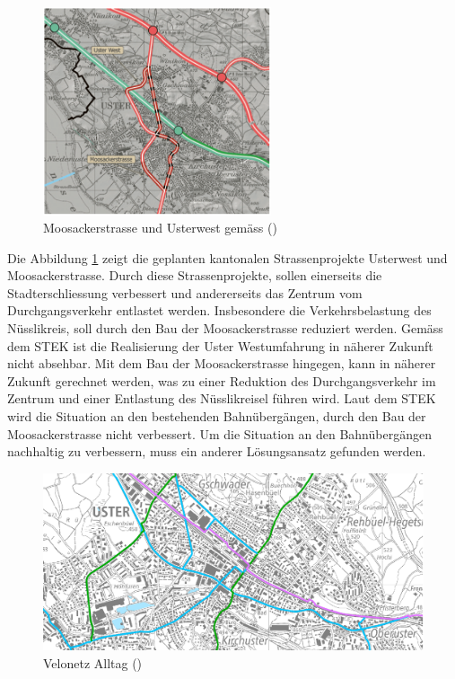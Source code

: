 \begin{figure}[h!]
	\centering
	\includegraphics[width=0.6\textwidth]{figures/04-04-UsterWest-Moosackerstr}
	\caption[Strassenprojekte im Kantonalen Richtplan]{Moosackerstrasse und Usterwest gemäss (\cite{STEK})}
	\label{img:Strassenprojekte}
\end{figure}

Die Abbildung \ref{img:Strassenprojekte} zeigt die geplanten kantonalen Strassenprojekte Usterwest und Moosackerstrasse. Durch diese Strassenprojekte, sollen einerseits die Stadterschliessung verbessert und andererseits das Zentrum vom Durchgangsverkehr entlastet werden. Insbesondere die Verkehrsbelastung des Nüsslikreis, soll durch den Bau der Moosackerstrasse reduziert werden. Gemäss dem STEK ist die Realisierung der Uster Westumfahrung in näherer Zukunft nicht absehbar. Mit dem Bau der Moosackerstrasse hingegen, kann in näherer Zukunft gerechnet werden, was zu einer Reduktion des Durchgangsverkehr im Zentrum und einer Entlastung des Nüsslikreisel führen wird. Laut dem STEK wird die Situation an den bestehenden Bahnübergängen, durch den Bau der Moosackerstrasse nicht verbessert. Um die Situation an den Bahnübergängen nachhaltig zu verbessern, muss ein anderer Lösungsansatz gefunden werden. 

\begin{figure}[h!]
	\centering
	\includegraphics[width=\textwidth]{figures/04-01-Veloweg-Alltag}
	\caption[Velonetz Alltag]{Velonetz Alltag (\cite{GIS})}
	\label{img:Velonetz}
\end{figure}
 

